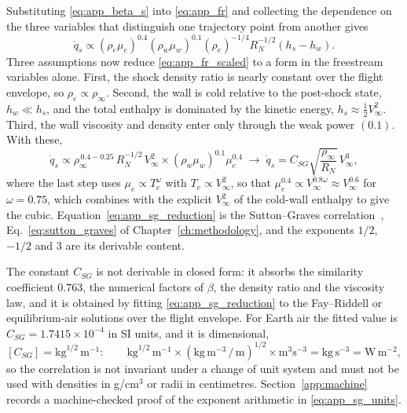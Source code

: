 Substituting \eqref{eq:app_beta_s} into \eqref{eq:app_fr} and collecting the dependence on the three variables that distinguish one trajectory point from another gives
\begin{equation}
    \dot{q}_s \propto \left(\rho_e\mu_e\right)^{0.4}\left(\rho_w\mu_w\right)^{0.1}\left(\rho_e\right)^{-1/4}R_N^{-1/2}\left(h_s - h_w\right) .
    \label{eq:app_fr_scaled}
\end{equation}
Three assumptions now reduce \eqref{eq:app_fr_scaled} to a form in the freestream variables alone. First, the shock density ratio is nearly constant over the flight envelope, so $\rho_e \propto \rho_\infty$. Second, the wall is cold relative to the post-shock state, $h_w \ll h_s$, and the total enthalpy is dominated by the kinetic energy, $h_s \approx \tfrac12V_\infty^2$. Third, the wall viscosity and density enter only through the weak power $(0.1)$. With these,
\begin{equation}
    \dot{q}_s \propto \rho_\infty^{\,0.4-0.25}\,R_N^{-1/2}\,V_\infty^{2} \times \left(\rho_w\mu_w\right)^{0.1}\mu_e^{0.4}
    \;\longrightarrow\;
    \dot{q}_s = C_{SG}\sqrt{\frac{\rho_\infty}{R_N}}\,V_\infty^{3} ,
    \label{eq:app_sg_reduction}
\end{equation}
where the last step uses $\mu_e \propto T_e^{\omega}$ with $T_e \propto V_\infty^2$, so that $\mu_e^{0.4} \propto V_\infty^{0.8\omega} \approx V_\infty^{0.6}$ for $\omega = 0.75$, which combines with the explicit $V_\infty^2$ of the cold-wall enthalpy to give the cubic. Equation~\eqref{eq:app_sg_reduction} is the Sutton--Graves correlation~\cite{sutton1971gravesh}, Eq.~\eqref{eq:sutton_graves} of Chapter~\ref{ch:methodology}, and the exponents $1/2$, $-1/2$ and $3$ are its derivable content.

The constant $C_{SG}$ is not derivable in closed form: it absorbs the similarity coefficient $0.763$, the numerical factors of $\beta$, the density ratio and the viscosity law, and it is obtained by fitting \eqref{eq:app_sg_reduction} to the Fay--Riddell or equilibrium-air solutions over the flight envelope. For Earth air the fitted value is $C_{SG} = 1.7415\times10^{-4}$ in SI units, and it is dimensional,
\begin{equation}
    \left[C_{SG}\right] = \mathrm{kg}^{1/2}\,\mathrm{m}^{-1} :
    \qquad
    \mathrm{kg}^{1/2}\,\mathrm{m}^{-1}\times\left(\mathrm{kg}\,\mathrm{m}^{-3}\,/\,\mathrm{m}\right)^{1/2}\times\mathrm{m}^3\mathrm{s}^{-3} = \mathrm{kg}\,\mathrm{s}^{-3} = \mathrm{W\,m^{-2}} ,
    \label{eq:app_sg_units}
\end{equation}
so the correlation is not invariant under a change of unit system and must not be used with densities in g/cm$^3$ or radii in centimetres. Section~\ref{app:machine} records a machine-checked proof of the exponent arithmetic in \eqref{eq:app_sg_units}.

